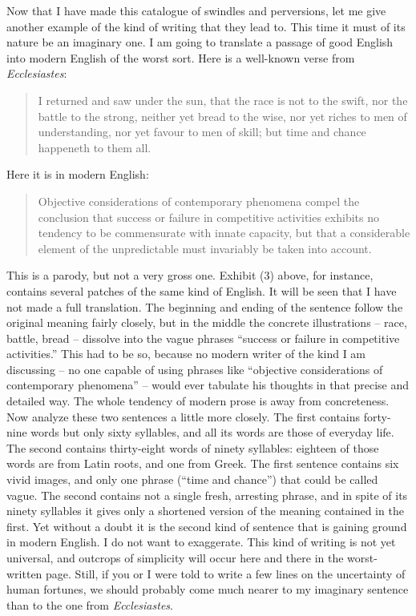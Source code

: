\documentclass[article,twoside,a4paper]{memoir}
\begin{document}
Now that I have made this catalogue of swindles and perversions, let me give
another example of the kind of writing that they lead to. This time it must
of its nature be an imaginary one. I am going to translate a passage of good
English into modern English of the worst sort. Here is a well-known verse from
\emph{Ecclesiastes}:

\begin{quotation}
  I returned and saw under the sun, that the race is not to the swift, nor
  the battle to the strong, neither yet bread to the wise, nor yet riches to
  men of understanding, nor yet favour to men of skill; but time and chance
  happeneth to them all.
\end{quotation}

Here it is in modern English:

\begin{quotation}
  Objective considerations of contemporary phenomena compel the conclusion
  that success or failure in competitive activities exhibits no tendency to
  be commensurate with innate capacity, but that a considerable element of the
  unpredictable must invariably be taken into account.
\end{quotation}

This is a parody, but not a very gross one. Exhibit (3) above, for instance,
contains several patches of the same kind of English. It will be seen that I
have not made a full translation. The beginning and ending of the sentence follow
the original meaning fairly closely, but in the middle the concrete illustrations
-- race, battle, bread -- dissolve into the vague phrases ``success or failure
in competitive activities.'' This had to be so, because no modern writer
of the kind I am discussing -- no one capable of using phrases like ``objective
considerations of contemporary phenomena'' -- would ever tabulate his thoughts
in that precise and detailed way. The whole tendency of modern prose is away
from concreteness. Now analyze these two sentences a little more closely. The
first contains forty-nine words but only sixty syllables, and all its words
are those of everyday life. The second contains thirty-eight words of ninety
syllables: eighteen of those words are from Latin roots, and one from Greek.
The first sentence contains six vivid images, and only one phrase (``time
and chance'') that could be called vague. The second contains not a single
fresh, arresting phrase, and in spite of its ninety syllables it gives only
a shortened version of the meaning contained in the first. Yet without a doubt
it is the second kind of sentence that is gaining ground in modern English.
I do not want to exaggerate. This kind of writing is not yet universal, and
outcrops of simplicity will occur here and there in the worst-written page.
Still, if you or I were told to write a few lines on the uncertainty of human
fortunes, we should probably come much nearer to my imaginary sentence than
to the one from \emph{Ecclesiastes}.
\end{document}
